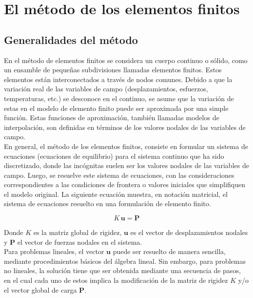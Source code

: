 
\section{El método de los elementos finitos}

\subsection{Generalidades del método}

En el método de elementos finitos se considera un cuerpo continuo o sólido, como un ensamble de pequeñas subdivisiones llamadas elementos finitos. Estos elementos están interconectados a través de nodos comunes. Debido a que la variación real de las variables de campo (desplazamientos, esfuerzos, temperaturas, etc.) se desconoce en el continuo, se asume que la variación de estas en el modelo de elemento finito puede ser aproximada por una simple función. Estas funciones de aproximación, también llamadas modelos de interpolación, son definidas en términos de los valores nodales de las variables de campo.\\

En general, el método de los elementos finitos, consiste en formular un sistema de ecuaciones (ecuaciones de equilibrio) para el sistema continuo que ha sido discretizado, donde las incógnitas suelen ser los valores nodales de las variables de campo. Luego, se resuelve este sistema de ecuaciones, con las consideraciones correspondientes a las condiciones de frontera o valores iniciales que simplifiquen el modelo original. La siguiente ecuación muestra, en notación matricial, el sistema de ecuaciones resuelto en una formulación de elemento finito.

\begin{equation}
K\,\bm{u} = \bm{P}
\end{equation}

Donde $K$ es la matriz global de rigidez, $\bm{u}$ es el vector de desplazamientos nodales y $\bm{P}$ el 
vector de fuerzas nodales en el sistema.\\

Para problemas lineales, el vector $\bm{u}$ puede ser resuelto de manera sencilla, mediante 
procedimientos básicos del álgebra lineal. Sin embargo, para problemas no lineales, la solución 
tiene que ser obtenida mediante una secuencia de pasos, en el cual cada uno de estos implica la 
modificación de la matriz de rigidez $K$ y/o el vector global de carga $\bm{P}$.\\

